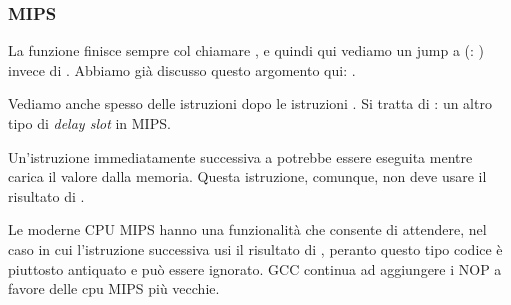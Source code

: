 \subsubsection{MIPS}




La funzione finisce sempre col chiamare \puts, e quindi qui vediamo un jump a \puts (: ) invece di .
Abbiamo già discusso questo argomento qui: .

Vediamo anche spesso delle istruzioni  dopo le istruzioni .
Si tratta di : un altro tipo di \emph{delay slot} in MIPS.

Un'istruzione immediatamente successiva a  potrebbe essere eseguita mentre  carica il valore dalla memoria.
Questa istruzione, comunque, non deve usare il risultato di .

Le moderne CPU MIPS hanno una funzionalità che consente di attendere, nel caso in cui l'istruzione successiva usi il risultato di 
, peranto questo tipo codice è piuttosto antiquato e può essere ignorato. GCC continua ad aggiungere i NOP a favore delle cpu MIPS più vecchie.

